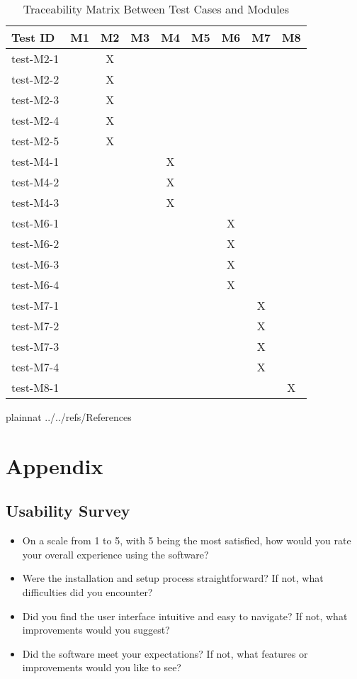 \documentclass[12pt, titlepage]{article}
\begin{document}
\begin{table}[h!]\label{Table:Unit}
  \centering
  \begin{tabular}{|l|c|c|c|c|c|c|c|c|}
  \hline
  \textbf{Test ID} & \textbf{M1} & \textbf{M2} & \textbf{M3} & \textbf{M4} & \textbf{M5} & \textbf{M6} & \textbf{M7} & \textbf{M8} \\
  \hline
  test-M2-1 &   & X &   &   &   &   &   &   \\
  test-M2-2 &   & X &   &   &   &   &   &   \\
  test-M2-3 &   & X &   &   &   &   &   &   \\
  test-M2-4 &   & X &   &   &   &   &   &   \\
  test-M2-5 &   & X &   &   &   &   &   &   \\
  test-M4-1 &   &   &   & X &   &   &   &   \\
  test-M4-2 &   &   &   & X &   &   &   &   \\
  test-M4-3 &   &   &   & X &   &   &   &   \\
  test-M6-1 &   &   &   &   &   & X &   &   \\
  test-M6-2 &   &   &   &   &   & X &   &   \\
  test-M6-3 &   &   &   &   &   & X &   &   \\
  test-M6-4 &   &   &   &   &   & X &   &   \\
  test-M7-1 &   &   &   &   &   &   & X &   \\
  test-M7-2 &   &   &   &   &   &   & X &   \\
  test-M7-3 &   &   &   &   &   &   & X &   \\
  test-M7-4 &   &   &   &   &   &   & X &   \\
  test-M8-1 &   &   &   &   &   &   &   & X \\
  \hline
  \end{tabular}
  \caption{Traceability Matrix Between Test Cases and Modules}
  \end{table}

   {plainnat}
   {../../refs/References}

\newpage
\section{Appendix}


\subsection{Usability Survey}\label{US}
\begin{itemize}
\item On a scale from 1 to 5, with 5 being the most satisfied, how would you rate your overall experience using the software?
\item Were the installation and setup process straightforward? If not, what difficulties did you encounter?
\item Did you find the user interface intuitive and easy to navigate? If not, what improvements would you suggest?
\item Did the software meet your expectations? If not, what features or improvements would you like to see?
\end{itemize}
\end{document}
